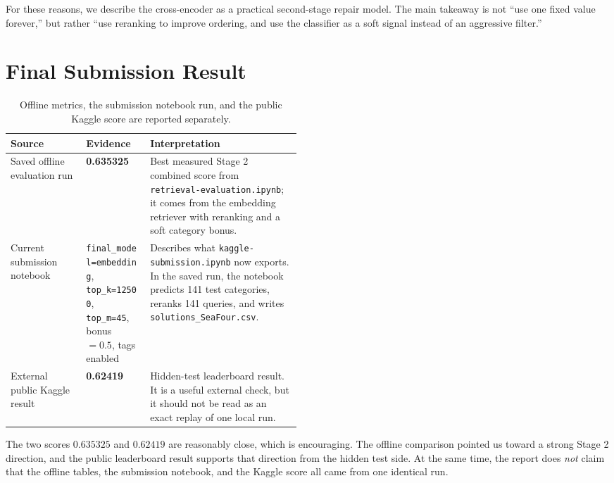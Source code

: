 \documentclass[11pt,a4paper]{article}
\begin{document}
For these reasons, we describe the cross-encoder as a practical second-stage repair model. The main takeaway is not ``use one fixed value forever,'' but rather ``use reranking to improve ordering, and use the classifier as a soft signal instead of an aggressive filter.''

\section{Final Submission Result}

\begin{table}[H]
\centering
\small
\begin{tabularx}{\linewidth}{p{0.26\linewidth}p{0.22\linewidth}Y}
\toprule
Source & Evidence & Interpretation \\
\midrule
Saved offline evaluation run & \textbf{0.635325} & Best measured Stage 2 combined score from \texttt{retrieval-evaluation.ipynb}; it comes from the embedding retriever with reranking and a soft category bonus. \\
Current submission notebook & \texttt{final\_model=embedding}, \texttt{top\_k=12500}, \texttt{top\_m=45}, bonus \(=0.5\), tags enabled & Describes what \texttt{kaggle-submission.ipynb} now exports. In the saved run, the notebook predicts 141 test categories, reranks 141 queries, and writes \texttt{solutions\_SeaFour.csv}. \\
External public Kaggle result & \textbf{0.62419} & Hidden-test leaderboard result. It is a useful external check, but it should not be read as an exact replay of one local run. \\
\bottomrule
\end{tabularx}
\caption{Offline metrics, the submission notebook run, and the public Kaggle score are reported separately.}
\label{tab:finalscores}
\end{table}

The two scores \(0.635325\) and \(0.62419\) are reasonably close, which is encouraging. The offline comparison pointed us toward a strong Stage 2 direction, and the public leaderboard result supports that direction from the hidden test side. At the same time, the report does \emph{not} claim that the offline tables, the submission notebook, and the Kaggle score all came from one identical run.
\end{document}
